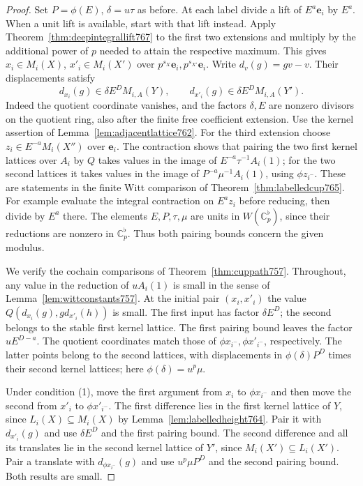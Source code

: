 \documentclass[a4paper,11pt]{article}
\theoremstyle{definition}
\theoremstyle{remark}
\numberwithin{equation}{section}
\begin{document}
\begin{proof}
Set \(P=\phi(E)\), \(\delta=u\tau\) as before. At each
label divide a lift of \(E^a\mathbf e_i\) by \(E^a\).
When a unit lift is available, start with that lift instead.
Apply Theorem~\ref{thm:deepintegrallift767} to the first
two extensions and multiply by the additional power of \(p\)
needed to attain the respective maximum. This gives
\(x_i\in M_i(X)\), \(x'_i\in M_i(X')\) over
\(p^{s_X}\mathbf e_i,p^{s_{X'}}\mathbf e_i\).
Write \(d_v(g)=gv-v\). Their displacements satisfy
\[
 d_{x_i}(g)\in\delta E^D M_{i,A}(Y),\qquad
 d_{x'_i}(g)\in\delta E^D M_{i,A}(Y').
\]
Indeed the quotient coordinate vanishes, and the factors
\(\delta,E\) are nonzero divisors on the quotient ring,
also after the finite free coefficient extension.
Use the kernel assertion of Lemma~\ref{lem:adjacentlattice762}.
For the third extension choose \(z_i\in E^{-a}M_i(X'')\)
over \(\mathbf e_i\). The contraction shows that pairing
the two first kernel lattices over \(A_i\) by \(Q\) takes
values in the image of \(E^{-a}\tau^{-1}A_i(1)\); for
the two second lattices it takes values in the image of
\(P^{-a}\mu^{-1}A_i(1)\), using \(\phi z_{i^-}\).
These are statements in the finite Witt comparison of
Theorem~\ref{thm:labelledcup765}. For example evaluate
the integral contraction on \(E^a z_i\) before reducing,
then divide by \(E^a\) there. The elements \(E,P,\tau,\mu\)
are units in \(W(\mathbb C_p^\flat)\), since their
reductions are nonzero in \(\mathbb C_p^\flat\).
Thus both pairing bounds concern the given modulus.

We verify the cochain comparisons of
Theorem~\ref{thm:cuppath757}. Throughout, any value in
the reduction of \(u A_i(1)\) is small in the sense of
Lemma~\ref{lem:wittconstants757}. At the initial pair
\((x_i,x'_i)\) the value \(Q(d_{x_i}(g),g d_{x'_i}(h))\)
is small. The first input has factor \(\delta E^D\);
the second belongs to the stable first kernel lattice.
The first pairing bound leaves the factor \(u E^{D-a}\).
The quotient coordinates match those of
\(\phi x_{i^-},\phi x'_{i^-}\), respectively.
The latter points belong to the second lattices, with
displacements in \(\phi(\delta)P^D\) times their second
kernel lattices; here \(\phi(\delta)=u^p\mu\).

Under condition (1), move the first argument from \(x_i\)
to \(\phi x_{i^-}\) and then move the second from \(x'_i\)
to \(\phi x'_{i^-}\). The first difference lies in the
first kernel lattice of \(Y\), since \(L_i(X)\subseteq
M_i(X)\) by Lemma~\ref{lem:labelledheight764}.
Pair it with \(d_{x'_i}(g)\) and use \(\delta E^D\) and
the first pairing bound. The second difference and all
its translates lie in the second kernel lattice of \(Y'\),
since \(M_i(X')\subseteq L_i(X')\). Pair a translate
with \(d_{\phi x_{i^-}}(g)\) and use \(u^p\mu P^D\)
and the second pairing bound. Both results are small.


\end{proof}
\end{document}
